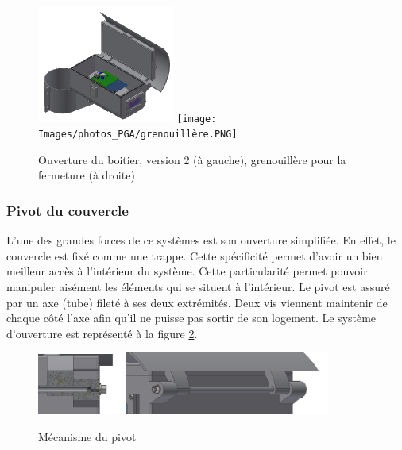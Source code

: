 
\begin{figure}[H]
    \centering
    \includegraphics[width=0.4\textwidth]{Images/photos_PGA/Boitierv41.PNG}
    \texttt{[image: Images/photos\_PGA/grenouillère.PNG]}
    \caption{Ouverture du boitier, version 2 (à gauche), grenouillère pour la fermeture (à droite)}
    \label{fig:ouverturev2}
\end{figure}

\subsubsection{Pivot du couvercle}

L’une des grandes forces de ce systèmes est son ouverture simplifiée. En effet, le couvercle est fixé 
comme une trappe. Cette spécificité permet d’avoir un bien meilleur accès à l’intérieur du système. 
Cette particularité permet pouvoir manipuler aisément les éléments qui se situent à l’intérieur. Le 
pivot est assuré par un axe (tube) fileté à ses deux extrémités. Deux vis viennent maintenir de chaque 
côté l’axe afin qu’il ne puisse pas sortir de son logement. Le système d'ouverture est représenté à la 
figure \ref{fig:pivot}.

\begin{figure}[H]
    \centering
    \includegraphics[width=0.25\textwidth]{Images/photos_PGA/pivotcoupe.PNG}
    \includegraphics[width=0.6\textwidth]{Images/photos_PGA/pivotnormal.PNG}
    \caption{Mécanisme du pivot}
    \label{fig:pivot}
\end{figure}

